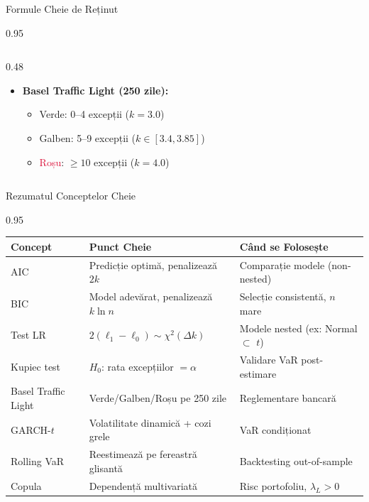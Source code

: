 \documentclass[9pt, aspectratio=169, t]{beamer}
\begin{document}
\begin{frame}{Formule Cheie de Reținut}
\begin{cminipage}{0.95\textwidth}
\begin{columns}[T]
\begin{column}{0.48\textwidth}
            \vspace{0.3cm}

            \begin{itemize}\setlength{\itemsep}{0pt}
                \item \textbf{Basel Traffic Light (250 zile):}
                \begin{itemize}\setlength{\itemsep}{0pt}
                    \item \textcolor{Forest}{Verde}: 0--4 excepții ($k = 3.0$)
                    \item \textcolor{Amber}{Galben}: 5--9 excepții ($k \in [3.4, 3.85]$)
                    \item \textcolor{Crimson}{Roșu}: $\geq 10$ excepții ($k = 4.0$)
                \end{itemize}
            \end{itemize}
        \end{column}
    \end{columns}
    \end{cminipage}
\end{frame}

\begin{frame}{Rezumatul Conceptelor Cheie}
    \begin{cminipage}{0.95\textwidth}
    \begin{center}
    \small
    \begin{tabular}{lll}
        \toprule
        \textbf{Concept} & \textbf{Punct Cheie} & \textbf{Când se Folosește} \\
        \midrule
        AIC & Predicție optimă, penalizează $2k$ & Comparație modele (non-nested) \\
        BIC & Model adevărat, penalizează $k\ln n$ & Selecție consistentă, $n$ mare \\
        Test LR & $2(\ell_1 - \ell_0) \sim \chi^2(\Delta k)$ & Modele nested (ex: Normal $\subset$ $t$) \\
        \midrule
        Kupiec test & $H_0$: rata excepțiilor $= \alpha$ & Validare VaR post-estimare \\
        Basel Traffic Light & Verde/Galben/Roșu pe 250 zile & Reglementare bancară \\
        \midrule
        GARCH-$t$ & Volatilitate dinamică + cozi grele & VaR condiționat \\
        Rolling VaR & Reestimează pe fereastră glisantă & Backtesting out-of-sample \\
        Copula & Dependență multivariată & Risc portofoliu, $\lambda_L > 0$ \\
        \bottomrule
    \end{tabular}
    \end{center}
    \end{cminipage}
\end{frame}
\end{document}
